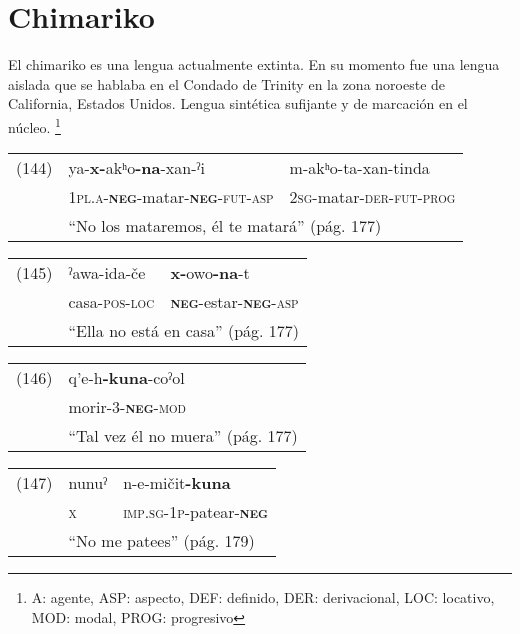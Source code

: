 \section*{Chimariko}

\noindent El chimariko es una lengua actualmente extinta. En su momento fue una lengua aislada que se hablaba en el Condado de Trinity en la zona noroeste de California, Estados Unidos. Lengua sintética sufijante y de marcación en el núcleo.
\footnote{A: agente, ASP: aspecto, DEF: definido, DER: derivacional, LOC: locativo, MOD: modal, PROG: progresivo}
\vspace{0.5cm}

{\setmainfont{Charis SIL} 

\noindent \begin{tabular}{lll}    
(144) & ya-\textbf{x-}akʰo\textbf{-na}-xan-ˀi & m-akʰo-ta-xan-tinda \\
& \textsc{1pl.a-\textbf{neg}-}matar-\textsc{\textbf{neg}-fut-asp} & \textsc{2sg-}matar-\textsc{der-fut-prog} \\
& \multicolumn{2}{l}{``No los mataremos, él te matará'' (pág. 177)}
\end{tabular} \vspace{0.5cm}

\noindent \begin{tabular}{lll}
(145) & ˀawa-ida-če & \textbf{x-}owo\textbf{-na}-t \\
& casa-\textsc{pos-loc} & \textsc{\textbf{neg}-}estar-\textsc{\textbf{neg}-asp} \\
& \multicolumn{2}{l}{``Ella no está en casa'' (pág. 177)}
\end{tabular} \vspace{0.5cm}

\noindent \begin{tabular}{ll}
(146) & q’e-h\textbf{-kuna}-coˀol \\
& morir-\textsc{3-\textbf{neg}-mod} \\
& ``Tal vez él no muera'' (pág. 177)
\end{tabular} \vspace{0.5cm}

\noindent \begin{tabular}{lll}
(147) & nunuˀ & n-e-mičit\textbf{-kuna} \\
& \textsc{x} & \textsc{imp.sg-1p-}patear-\textsc{\textbf{neg}} \\
& \multicolumn{2}{l}{``No me patees'' (pág. 179)}
\end{tabular} \vspace{0.5cm}

}

